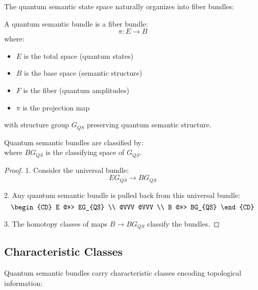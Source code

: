 \documentclass[12pt]{article}
\begin{document}
The quantum semantic state space naturally organizes into fiber bundles:

\begin{definition}
A quantum semantic bundle is a fiber bundle:
\begin{equation}
\pi: E \rightarrow B
\end{equation}
where:
\begin{itemize}
\item $E$ is the total space (quantum states)
\item $B$ is the base space (semantic structure)
\item $F$ is the fiber (quantum amplitudes)
\item $\pi$ is the projection map
\end{itemize}
with structure group $G_{QS}$ preserving quantum semantic structure.
\end{definition}

\begin{theorem}
Quantum semantic bundles are classified by:
\begin{equation}
[B,BG_{QS}]
\end{equation}
where $BG_{QS}$ is the classifying space of $G_{QS}$.
\end{theorem}

\begin{proof}
1. Consider the universal bundle:
\begin{equation}
EG_{QS} \rightarrow BG_{QS}
\end{equation}

2. Any quantum semantic bundle is pulled back from this universal bundle:
\begin{equation}
\begin{CD}
E @>>> EG_{QS} \\
@VVV @VVV \\
B @>>> BG_{QS}
\end{CD}
\end{equation}

3. The homotopy classes of maps $B \rightarrow BG_{QS}$ classify the bundles.
\end{proof}

\subsection{Characteristic Classes}

Quantum semantic bundles carry characteristic classes encoding topological information:
\end{document}
